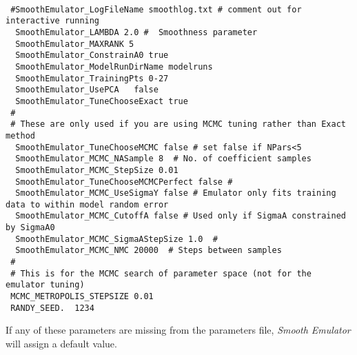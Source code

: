 \documentclass[UserManual.tex]{subfiles}
\begin{document}
{\tt
\begin{verbatim}
 #SmoothEmulator_LogFileName smoothlog.txt # comment out for interactive running
  SmoothEmulator_LAMBDA 2.0 #  Smoothness parameter
  SmoothEmulator_MAXRANK 5
  SmoothEmulator_ConstrainA0 true
  SmoothEmulator_ModelRunDirName modelruns
  SmoothEmulator_TrainingPts 0-27
  SmoothEmulator_UsePCA   false
  SmoothEmulator_TuneChooseExact true
 #
 # These are only used if you are using MCMC tuning rather than Exact method
  SmoothEmulator_TuneChooseMCMC false # set false if NPars<5
  SmoothEmulator_MCMC_NASample 8  # No. of coefficient samples
  SmoothEmulator_MCMC_StepSize 0.01
  SmoothEmulator_TuneChooseMCMCPerfect false #
  SmoothEmulator_MCMC_UseSigmaY false # Emulator only fits training data to within model random error
  SmoothEmulator_MCMC_CutoffA false # Used only if SigmaA constrained by SigmaA0
  SmoothEmulator_MCMC_SigmaAStepSize 1.0  #
  SmoothEmulator_MCMC_NMC 20000  # Steps between samples 
 #
 # This is for the MCMC search of parameter space (not for the emulator tuning)
 MCMC_METROPOLIS_STEPSIZE 0.01
 RANDY_SEED.  1234
\end{verbatim}
}
If any of these parameters are missing from the parameters file, {\it Smooth Emulator} will assign a default value.
\end{document}
